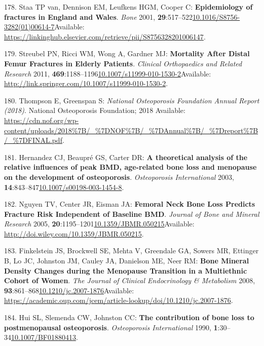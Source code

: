 \documentclass[
]{book}
\begin{document}
\leavevmode\hypertarget{ref-VanStaa2001}{}%
178. Staa TP van, Dennison EM, Leufkens HGM, Cooper C: \textbf{Epidemiology of fractures in England and Wales}. \emph{Bone} 2001, \textbf{29}:517--522\href{https://doi.org/10.1016/S8756-3282(01)00614-7}{10.1016/S8756-3282(01)00614-7}Available: \url{https://linkinghub.elsevier.com/retrieve/pii/S8756328201006147}.

\leavevmode\hypertarget{ref-Streubel2011}{}%
179. Streubel PN, Ricci WM, Wong A, Gardner MJ: \textbf{Mortality After Distal Femur Fractures in Elderly Patients}. \emph{Clinical Orthopaedics and Related Research} 2011, \textbf{469}:1188--1196\href{https://doi.org/10.1007/s11999-010-1530-2}{10.1007/s11999-010-1530-2}Available: \url{http://link.springer.com/10.1007/s11999-010-1530-2}.

\leavevmode\hypertarget{ref-Thompson2018}{}%
180. Thompson E, Greenspan S: \emph{National Osteoporosis Foundation Annual Report (2018)}. National Osteoporosis Foundation; 2018 Available: \url{https://cdn.nof.org/wp-content/uploads/2018\%7B/_\%7DNOF\%7B/_\%7DAnnual\%7B/_\%7Dreport\%7B/_\%7DFINAL.pdf}.

\leavevmode\hypertarget{ref-Hernandez2003}{}%
181. Hernandez CJ, Beaupré GS, Carter DR: \textbf{A theoretical analysis of the relative influences of peak BMD, age-related bone loss and menopause on the development of osteoporosis}. \emph{Osteoporosis International} 2003, \textbf{14}:843--847\href{https://doi.org/10.1007/s00198-003-1454-8}{10.1007/s00198-003-1454-8}.

\leavevmode\hypertarget{ref-Nguyen2005}{}%
182. Nguyen TV, Center JR, Eisman JA: \textbf{Femoral Neck Bone Loss Predicts Fracture Risk Independent of Baseline BMD}. \emph{Journal of Bone and Mineral Research} 2005, \textbf{20}:1195--1201\href{https://doi.org/10.1359/JBMR.050215}{10.1359/JBMR.050215}Available: \url{http://doi.wiley.com/10.1359/JBMR.050215}.

\leavevmode\hypertarget{ref-Finkelstein2008}{}%
183. Finkelstein JS, Brockwell SE, Mehta V, Greendale GA, Sowers MR, Ettinger B, Lo JC, Johnston JM, Cauley JA, Danielson ME, Neer RM: \textbf{Bone Mineral Density Changes during the Menopause Transition in a Multiethnic Cohort of Women}. \emph{The Journal of Clinical Endocrinology \& Metabolism} 2008, \textbf{93}:861--868\href{https://doi.org/10.1210/jc.2007-1876}{10.1210/jc.2007-1876}Available: \url{https://academic.oup.com/jcem/article-lookup/doi/10.1210/jc.2007-1876}.

\leavevmode\hypertarget{ref-Hui1990}{}%
184. Hui SL, Slemenda CW, Johnston CC: \textbf{The contribution of bone loss to postmenopausal osteoporosis}. \emph{Osteoporosis International} 1990, \textbf{1}:30--34\href{https://doi.org/10.1007/BF01880413}{10.1007/BF01880413}.
\end{document}
